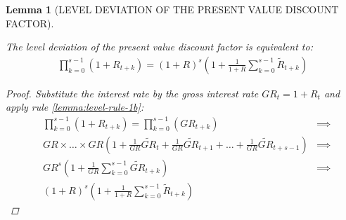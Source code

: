 \documentclass[
	12pt,
	]{article}
\numberwithin{equation}{section}
\theoremstyle{definition}
\theoremstyle{plain}
\theoremstyle{plain}
\newtheorem{lemma}{Lemma}[section]
\theoremstyle{plain}
\begin{document}

\begin{lemma}[LEVEL DEVIATION OF THE PRESENT VALUE DISCOUNT FACTOR]\label{product-operator}
	
	The level deviation of the present value discount factor is equivalent to:
	\begin{align}
	\label{eq:product-operator}
		\prod_{k=0}^{s-1}(1+R_{t+k}) = (1 + R)^s \left( 1 + \frac{1}{1 + R} \sum_{k=0}^{s-1} \widetilde{R}_{t+k} \right)
	\end{align}
	
	\begin{proof}
		Substitute the interest rate by the gross interest rate $GR_t = 1 + R_t$ and apply rule \ref{lemma:level-rule-1b}:
		\begin{align*}
			& \prod_{k=0}^{s-1}(1+R_{t+k}) = \prod_{k=0}^{s-1}(GR_{t+k})
		&\implies \nonumber \\
			& GR \times \dots \times GR \left( 1 + \frac{1}{GR} \widetilde{GR}_t + \frac{1}{GR} \widetilde{GR}_{t+1} + \dots + \frac{1}{GR} \widetilde{GR}_{t+s-1} \right)
		&\implies \nonumber \\
			& GR^s \left( 1 + \frac{1}{GR} \sum_{k=0}^{s-1} \widetilde{GR}_{t+k} \right)
		&\implies \nonumber \\
			& (1 + R)^s \left( 1 + \frac{1}{1 + R} \sum_{k=0}^{s-1} \widetilde{R}_{t+k} \right) &\,
		\end{align*}
	\end{proof}
	
\end{lemma}


\end{document}

